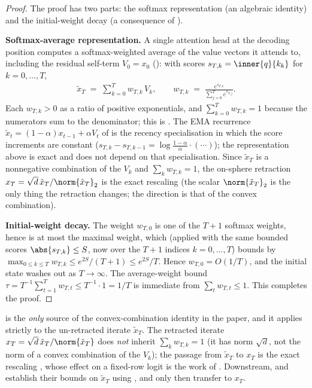 \begin{proof}
The proof has two parts: the softmax representation (an algebraic identity)
and the initial-weight decay (a consequence of ).

\smallskip\noindent\textbf{Softmax-average representation.} A single
attention head at the decoding position computes a softmax-weighted average
of the value vectors it attends to, including the residual self-term
$V_0=x_0$ (\cite{vaswani2017attention}): with scores
$s_{T,k}=\inner{q}{k_k}$ for $k=0,\dots,T$,
\begin{align*}
   \tilde x_T \;=\; \sum_{k=0}^{T} w_{T,k}\,V_k,
   \qquad
   w_{T,k} \;=\; \frac{e^{s_{T,k}}}{\sum_{j=0}^{T} e^{s_{T,j}}}.
\end{align*}
Each $w_{T,k}>0$ as a ratio of positive exponentials, and
$\sum_{k=0}^{T} w_{T,k}=1$ because the numerators sum to the denominator;
this is . The EMA recurrence
$\tilde x_t=(1-\alpha)x_{t-1}+\alpha V_t$ of  is the
recency specialisation in which the score increments are constant
($s_{T,k}-s_{T,k-1}=\log\frac{1-\alpha}{\alpha}\cdot(\cdots)$); the
representation above is exact and does not depend on that specialisation.
Since $\tilde x_T$ is a nonnegative combination of the $V_k$ and
$\sum_k w_{T,k}=1$, the on-sphere retraction
$x_T=\sqrt d\,\tilde x_T/\norm{\tilde x_T}_2$ is the exact rescaling
 (the scalar $\norm{\tilde x_T}_2$ is the only
thing the retraction changes; the direction is that of the convex
combination).

\smallskip\noindent\textbf{Initial-weight decay.} The weight $w_{T,0}$ is
one of the $T+1$ softmax weights, hence is at most the maximal weight,
which  (applied with the same bounded scores
$\abs{s_{T,k}}\le S$, now over the $T+1$ indices $k=0,\dots,T$) bounds by
$\max_{0\le k\le T}w_{T,k}\le e^{2S}/(T+1)\le e^{2S}/T$. Hence
$w_{T,0}=O(1/T)$, and the initial state washes out as $T\to\infty$. The
average-weight bound $\tau=T^{-1}\sum_{t=1}^{T}w_{T,t}\le T^{-1}\cdot1=1/T$
is immediate from $\sum_t w_{T,t}\le1$. This completes the proof.
\end{proof}

\begin{remark}
\label{rem:running_average_untransformed}
 is the \emph{only} source of the
convex-combination identity in the paper, and it applies strictly to the
un-retracted iterate $\tilde x_T$. The retracted iterate
$x_T=\sqrt d\,\tilde x_T/\norm{\tilde x_T}$ does \emph{not} inherit
$\sum_k w_{T,k}=1$ (it has norm $\sqrt d$, not the norm of a convex
combination of the $V_k$); the passage from $\tilde x_T$ to $x_T$ is the
exact rescaling , whose effect on a fixed-row
logit is the work of . Downstream,
 and  establish their bounds
on $\tilde x_T$ using , and only then transfer to
$x_T$.
\end{remark}
